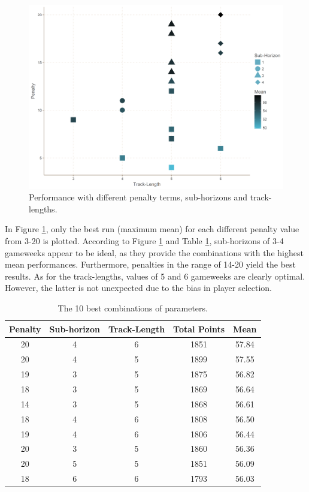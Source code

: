 \begin{figure}[H]
    \centering
    \includegraphics[scale=0.45]{fig/chapter_6/paramter_choice.png}
    \caption{Performance with different penalty terms, sub-horizons and track-lengths.}
\label{Parameter_choice}    
\end{figure}

In Figure \ref{Parameter_choice}, only the best run (maximum mean) for each different penalty value from 3-20 is plotted. According to Figure \ref{Parameter_choice} and Table \ref{tab:top_10}, sub-horizons of 3-4 gameweeks appear to be ideal, as they provide the combinations with the highest mean performances. Furthermore, penalties in the range of 14-20 yield the best results. As for the track-lengths, values of 5 and 6 gameweeks are clearly optimal. However, the latter is not unexpected due to the bias in player selection. 

\begin{table}[H]
\centering
\begin{tabular}{|c|c|c|c|c|}
\hline
Penalty & Sub-horizon & Track-Length & Total Points & Mean  \\
\hline
20      & 4       & 6                & 1851         & 57.84 \\
20      & 4       & 5                & 1899         & 57.55 \\
19      & 3       & 5                & 1875         & 56.82 \\
18      & 3       & 5                & 1869         & 56.64 \\
14      & 3       & 5                & 1868         & 56.61 \\
18      & 4       & 6                & 1808         & 56.50 \\
19      & 4       & 6                & 1806         & 56.44 \\
20      & 3       & 5                & 1860         & 56.36 \\
20      & 5       & 5                & 1851         & 56.09 \\
18      & 6       & 6                & 1793         & 56.03 \\
\hline
\end{tabular}
\caption{The 10 best combinations of parameters.}
\label{tab:top_10}
\end{table}


